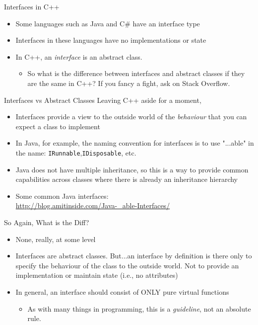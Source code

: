 \documentclass[10pt,xcolor={table,dvipsnames},t]{beamer}
\begin{document}
\begin{frame}[c]{Interfaces in C++}
\large
\begin{itemize}
	\item Some languages such as Java and C\# have an interface type
	\item Interfaces in these languages have no implementations or state
	\item In C++, an \textit{interface} is an abstract class.
    \begin{itemize}
	    \item So what is the difference between interfaces and abstract classes if they
	are the same in C++? If you fancy a fight, ask on Stack Overflow.
    \end{itemize}
\end{itemize}
\end{frame}

\begin{frame}[c]{Interfaces vs Abstract Classes}
\large
Leaving C++ aside for a moment,
\begin{itemize}
	\item Interfaces provide a view to the outside world of the \textit{behaviour} 
	that you can expect a class to implement
	\item In Java, for example, the naming convention for interfaces is to use "...able" in the name: \texttt{IRunnable},\texttt{IDisposable}, etc.
	\item Java does not have multiple inheritance, so this is a way to provide
	common capabilities across classes where there is already an inheritance
	hierarchy
	\item Some common Java interfaces:\\ \url{http://blog.amitinside.com/Java-_able-Interfaces/}
\end{itemize}

\end{frame}

\begin{frame}[c]{So Again, What is the Diff?}
\large
\begin{itemize}
	\item None, really, at some level
	\item Interfaces are abstract classes. But...an interface by definition
	is there only to specify the behaviour of the class to the outside world. Not
	to provide an implementation or maintain state (i.e., no attributes)
	\item In general, an interface should consist of ONLY pure virtual functions
	\begin{itemize}
	\item As with many things in programming, this is a \textit{guideline}, not
	an absolute rule.
\end{itemize}

\end{itemize}

\end{frame}
\end{document}
